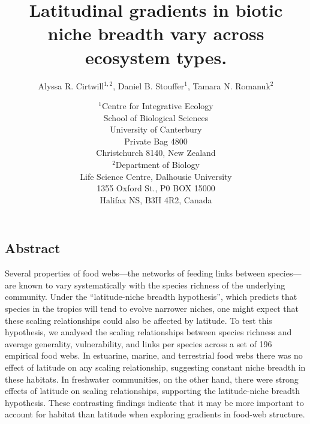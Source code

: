 \documentclass[12pt]{article}
\begin{document}
\title{Latitudinal gradients in biotic niche breadth vary across ecosystem types.}
\author{Alyssa R. Cirtwill$^{1,2}$, Daniel B. Stouffer$^{1}$, Tamara N. Romanuk$^{2}$}
\date{\small$^1$Centre for Integrative Ecology\\School of Biological Sciences\\University of Canterbury\\
Private Bag 4800\\Christchurch 8140, New Zealand \\
\medskip$^2$Department of Biology\\
Life Science Centre, Dalhousie University\\1355 Oxford St., P0 BOX 15000\\
Halifax NS, B3H 4R2, Canada\\}

\maketitle
\baselineskip=8.5mm
 
\vspace{-0.3 in}

\begin{spacing}{1.0}
\section*{Abstract}

Several properties of food webs---the networks of feeding links between
species---are known to vary systematically with the species richness of the
underlying community.  Under the ``latitude-niche breadth hypothesis'', which
predicts that species in the tropics will tend to evolve narrower niches, one
might expect that these scaling relationships could also be affected by
latitude. To test this hypothesis, we analysed the scaling relationships
between species richness and average generality, vulnerability, and links per
species across a set of 196 empirical food webs. In estuarine, marine, and 
terrestrial food webs there was no effect of latitude on any scaling relationship,
suggesting constant niche breadth in these habitats. In freshwater communities,
on the other hand, there were strong effects of latitude on scaling relationships,
supporting the latitude-niche breadth hypothesis. These contrasting findings
indicate that it may be more important to account for habitat than latitude
when exploring gradients in food-web structure.

\end{spacing}
\end{document}
